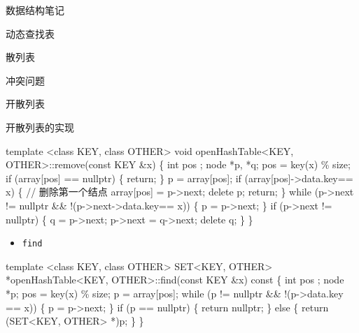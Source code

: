 \documentclass[
  ignorenonframetext,
]{beamer}
\newenvironment{Shaded}{}{}
\newcommand{\NormalTok}[1]{#1}
\providecommand{\tightlist}{%
  \setlength{\itemsep}{0pt}\setlength{\parskip}{0pt}}
\begin{document}
\begin{frame}[fragile]{数据结构笔记}
\begin{block}{动态查找表}
\begin{block}{散列表}
\begin{block}{冲突问题}
\begin{block}{开散列表}
\begin{block}{开散列表的实现}
\begin{Shaded}
\begin{Highlighting}[]
\NormalTok{template \textless{}class KEY, class OTHER\textgreater{}}
\NormalTok{void openHashTable\textless{}KEY, OTHER\textgreater{}::remove(const KEY \&x)}
\NormalTok{\{}
\NormalTok{  int pos ;}
\NormalTok{  node *p, *q;}
\NormalTok{  pos = key(x) \% size;}
\NormalTok{  if (array[pos] == nullptr)}
\NormalTok{  \{}
\NormalTok{    return;}
\NormalTok{  \}}
\NormalTok{  p = array[pos];}
\NormalTok{  if (array[pos]{-}\textgreater{}data.key== x)}
\NormalTok{  \{ // 删除第一个结点}
\NormalTok{    array[pos] = p{-}\textgreater{}next;}
\NormalTok{    delete p;}
\NormalTok{    return;}
\NormalTok{  \}}
\NormalTok{  while (p{-}\textgreater{}next != nullptr \&\& !(p{-}\textgreater{}next{-}\textgreater{}data.key== x))}
\NormalTok{  \{}
\NormalTok{    p = p{-}\textgreater{}next;}
\NormalTok{  \}}
\NormalTok{  if (p{-}\textgreater{}next != nullptr)}
\NormalTok{  \{}
\NormalTok{    q = p{-}\textgreater{}next;}
\NormalTok{    p{-}\textgreater{}next = q{-}\textgreater{}next;}
\NormalTok{    delete q;}
\NormalTok{  \}}
\NormalTok{\}}
\end{Highlighting}
\end{Shaded}

\begin{itemize}
\tightlist
\item
  \texttt{find}
\end{itemize}

\begin{Shaded}
\begin{Highlighting}[]
\NormalTok{template \textless{}class KEY, class OTHER\textgreater{}}
\NormalTok{SET\textless{}KEY, OTHER\textgreater{} *openHashTable\textless{}KEY, OTHER\textgreater{}::find(const KEY \&x) const}
\NormalTok{\{}
\NormalTok{  int pos ;}
\NormalTok{  node *p;}
\NormalTok{  pos = key(x) \% size;}
\NormalTok{  p = array[pos];}
\NormalTok{  while (p != nullptr \&\& !(p{-}\textgreater{}data.key == x))}
\NormalTok{  \{}
\NormalTok{    p = p{-}\textgreater{}next;}
\NormalTok{  \}}
\NormalTok{  if (p == nullptr)}
\NormalTok{  \{}
\NormalTok{    return nullptr;}
\NormalTok{  \}}
\NormalTok{  else}
\NormalTok{  \{}
\NormalTok{    return (SET\textless{}KEY, OTHER\textgreater{} *)p;}
\NormalTok{  \}}
\NormalTok{\}}
\end{Highlighting}
\end{Shaded}
\end{block}
\end{block}
\end{block}
\end{block}
\end{block}


\end{frame}
\end{document}
